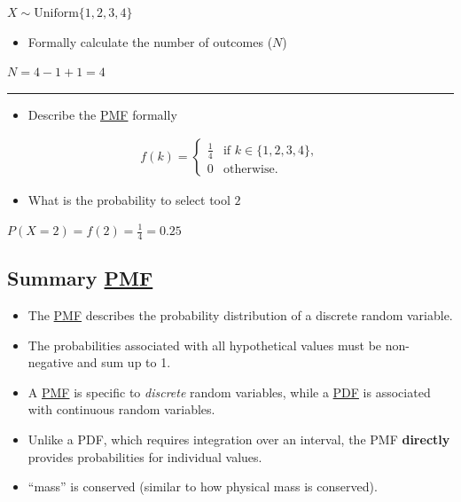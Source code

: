 \documentclass[
  a4paper,
]{scrbook}
\providecommand{\tightlist}{%
  \setlength{\itemsep}{0pt}\setlength{\parskip}{0pt}}\usepackage{longtable,booktabs,array}
\begin{document}
\(X \sim \mathrm{Uniform}\{1,2,3,4\}\)

\begin{itemize}
\tightlist
\item
  Formally calculate the number of outcomes (\(N\))
\end{itemize}

\(N = 4-1+1 = 4\)

\begin{center}\rule{0.5\linewidth}{0.5pt}\end{center}

\begin{itemize}
\tightlist
\item
  Describe the \hyperref[acronyms_PMF]{PMF} formally
\end{itemize}

\begin{align}
f(k) = \begin{cases}
\frac{1}{4} & \text{if } k \in \{1,2,3,4\}, \\
0 & \text{otherwise.}
\end{cases}
\end{align}

\begin{itemize}
\tightlist
\item
  What is the probability to select tool \(2\)
\end{itemize}

\(P(X = 2) = f(2) = \frac{1}{4} = 0.25\)

\subsection{\texorpdfstring{Summary
\hyperref[acronyms_PMF]{PMF}}{Summary PMF}}\label{summary}

\begin{itemize}
\item
  The \hyperref[acronyms_PMF]{PMF} describes the probability
  distribution of a discrete random variable.
\item
  The probabilities associated with all hypothetical values must be
  non-negative and sum up to 1.
\item
  A \hyperref[acronyms_PMF]{PMF} is specific to \emph{discrete} random
  variables, while a \hyperref[acronyms_PDF]{PDF} is associated with
  continuous random variables.
\item
  Unlike a PDF, which requires integration over an interval, the PMF
  \textbf{directly} provides probabilities for individual values.
\item
  ``mass'' is conserved (similar to how physical mass is conserved).
\end{itemize}
\end{document}
